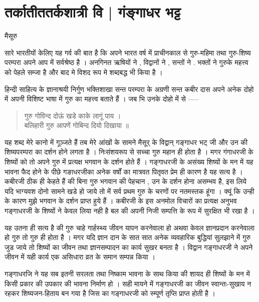 \chapter{तर्कातीततर्कशात्री वि | गंङ्गाधर भट्ट}

\begin{center}
\smallskip
मैसूरु
\addrule
\end{center}
सारे भारतीयों केलिए यह गर्व की बात है कि अपने भारत वर्ष में प्राचीनकाल से गुरु-महिमा तथा गुरु-शिष्य परम्परा अपने आप में सर्वश्रेष्ठ है । अनगिनत ऋषियों ने , विद्वानों ने , सन्तों ने . भक्तों ने गुरुके महत्त्व को पेहले सम्जा है और बाद मे विशद रूप मे शब्दबद्ध भी किया है । 

हिन्दी साहित्य के ज्ञानाश्रयी निर्गुण भक्तिशाखा सन्त परम्परा के अग्रणी सन्त कबीर दास अपने अनेक दोहो में अपनी विशिष्ट भाषा में गुरु का महत्त्व बताते हैं । जब भि उनके दोहो में से ----- 
\begin{verse}
गुरु गोविन्द दोऊं खडे काके लागूं पाय ।\\	
बलिहारी गुरु आपणें गोबिन्द दियो दिखाया ॥
\end{verse}
यह शब्द मेरे कानो में गूञ्जते हैं तब मेरे आंखों के सामने मैसूर् के विद्वान् गङ्गाधर भट् जी और उन की शिष्यपरम्परा का दर्शन होने लगता है । निःसंशयरूप से सच्चा गुरु महान ही होता है । मगर गंगाधरजी के शिष्यों को तो अपने गुरु में प्रत्यक्ष भगवान के दर्शन होते हैं । गङ्गाधरजी के असंख्य शिष्यों के मन में यह भावना फैद होने के पीछे गङाधरजीका अनेक वर्षों का मात्रवत पितृवत प्रेम ही कारण है यह सत्य है । कबीरजी ठीक ही केहते हैं की बिना गुरु भगवान की पेहचान , उन के दर्शन होना असम्भव है, इस लिये यदि भाग्यवश दोनो सामने खडे हो जाये तो में सर्व  प्रथम गुरु के चरणों पर नतमस्तक हूंगा । क्यूं कि उन्ही के कारण मुझे भगवान के दर्शन प्राप्त हुये हैं । कबीरजी के इस अनमोल विचारों का प्रत्यक्ष अनुभव गङ्गाधरजी के शिष्यों ने केवल लिया नही है बल की अपनी निजी सम्पत्ति के रूप में सुरक्षित भी रखा है । 

यह उतना ही सत्य है की गुरु चाहे गार्हस्थ्य जीवन यापन करनेवाला हो अथवा केवल ज्ञानप्रदान करनेवाला हो गुरु तो गुरु ही होता है । मगर यदि ज्ञान दान के सात सात अनेक व्यवहारिक बुद्धियां सुलझाने में गुरु जुड जाये तो शिष्यों का जीवन तथा ज्ञानसम्पादन का कार्य सुखर बनता है । विद्वान गङ्गाधरजी ने अपने जीवन में यही कार्य एक असिधारा व्रत के समान सम्पन्न किया । 

गङ्गाधरजि ने यह सब इतनी सरलता तथा निष्काम भावना के साथ किया की शायद ही शिष्यों के मन में किसी प्रकार की उपकार की भावना निर्माण हो । सही मायने में गङ्गाधरजी का जीवन स्वान्तः-सुखाय न रहकर शिष्यजन-हिताय बन गया है जिस का गङ्गाधरजी को स्म्पूर्ण तृप्ति प्राप्त होती है ।

